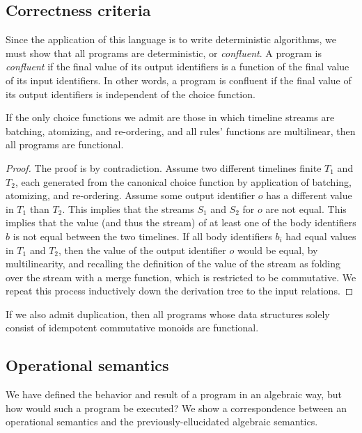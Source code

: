 \subsection{Correctness criteria}

Since the application of this language is to write deterministic algorithms, we must show that all programs are deterministic, or {\em confluent}.  A program is {\em confluent} if the final value of its output identifiers is a function of the final value of its input identifiers.  In other words, a program is confluent if the final value of its output identifiers is independent of the choice function.

\begin{theorem}[Confluence]
If the only choice functions we admit are those in which timeline streams are batching, atomizing, and re-ordering, and all rules' functions are multilinear, then all programs are functional.
\end{theorem}

\begin{proof}
The proof is by contradiction.  Assume two different timelines finite $T_1$ and $T_2$, each generated from the canonical choice function by application of batching, atomizing, and re-ordering.  Assume some output identifier $o$ has a different value in $T_1$ than $T_2$.  This implies that the streams $S_1$ and $S_2$ for $o$ are not equal.  This implies that the value (and thus the stream) of at least one of the body identifiers $b$ is not equal between the two timelines.  If all body identifiers $b_i$ had equal values in $T_1$ and $T_2$, then the value of the output identifier $o$ would be equal, by multilinearity, and recalling the definition of the value of the stream as folding over the stream with a merge function, which is restricted to be commutative.  We repeat this process inductively down the derivation tree to the input relations.
\end{proof}

\begin{corollary}
If we also admit duplication, then all programs whose data structures solely consist of idempotent commutative monoids are functional.
\end{corollary}


\subsection{Operational semantics}

We have defined the behavior and result of a program in an algebraic way, but how would such a program be executed?  We show a correspondence between an operational semantics and the previously-ellucidated algebraic semantics.

